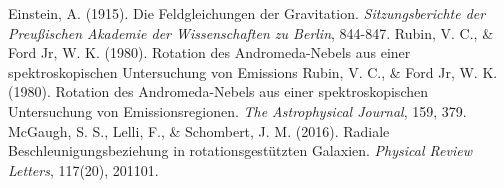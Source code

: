 \documentclass[12pt,a4paper]{article}
\begin{document}
\begin{thebibliography}{99}
		
		 Einstein, A. (1915). Die Feldgleichungen der Gravitation. \textit{Sitzungsberichte der Preußischen Akademie der Wissenschaften zu Berlin}, 844-847.
		 Rubin, V. C., \& Ford Jr, W. K. (1980). Rotation des Andromeda-Nebels aus einer spektroskopischen Untersuchung von Emissions
		 Rubin, V. C., \& Ford Jr, W. K. (1980). Rotation des Andromeda-Nebels aus einer spektroskopischen Untersuchung von Emissionsregionen. \textit{The Astrophysical Journal}, 159, 379.
		 McGaugh, S. S., Lelli, F., \& Schombert, J. M. (2016). Radiale Beschleunigungsbeziehung in rotationsgestützten Galaxien. \textit{Physical Review Letters}, 117(20), 201101.
		\end{thebibliography}
		
	
\end{document}

